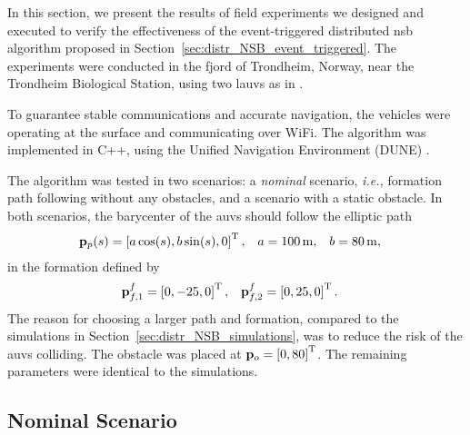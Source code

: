 

In this section, we present the results of field experiments we designed and executed to verify the effectiveness of the event-triggered distributed \gls{nsb} algorithm proposed in Section~\ref{sec:distr_NSB_event_triggered}.
The experiments were conducted in the fjord of Trondheim, Norway, near the Trondheim Biological Station, using two \glspl{lauv} as in .

To guarantee stable communications and accurate navigation, the vehicles were operating at the surface and communicating over WiFi.
The algorithm was implemented in C++, using the Unified Navigation Environment (DUNE) \cite{dune}.

The algorithm was tested in two scenarios: a \emph{nominal} scenario, \emph{i.e.,} formation path following without any obstacles, and a scenario with a static obstacle.
In both scenarios, the barycenter of the \glspl{auv} should follow the elliptic path
\begin{align}
    \mathbf{p}_p(s) &= \left[a \cos(s), b \sin(s), 0\right]^{\mathrm{T}},& 
    a &= \SI{100}{\meter},& 
    b &= \SI{80}{\meter},
\end{align}
in the formation defined by
\begin{align}
    \mathbf{p}_{f, 1}^f &= \left[0, -25, 0\right]^{\mathrm{T}}, &
    \mathbf{p}_{f, 2}^f &= \left[0, 25, 0\right]^{\mathrm{T}}.
\end{align}
The reason for choosing a larger path and formation, compared to the simulations in Section~\ref{sec:distr_NSB_simulations}, was to reduce the risk of the \glspl{auv} colliding.
The obstacle was placed at $\mathbf{p}_o = \left[0, 80\right]^{\mathrm{T}}$.
The remaining parameters were identical to the simulations.

\subsection{Nominal Scenario}

